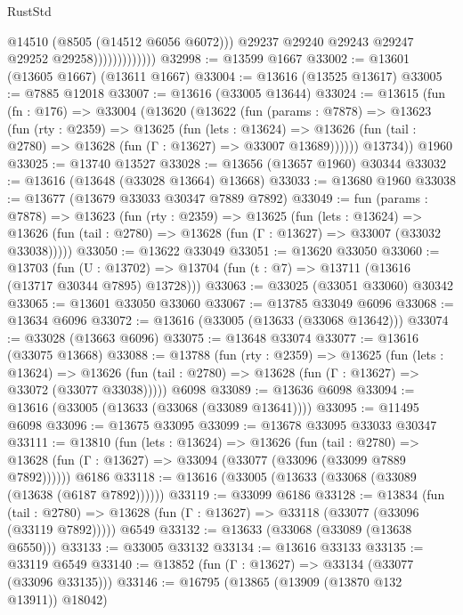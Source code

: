 \begin{lexlean}{RustStd}
\begin{coremodule}
                                @14510
                                (@8505 (@14512 @6056 @6072)))
                              @29237
                              @29240
                              @29243
                              @29247
                              @29252
                              @29258)))))))))))))
@32998 := @13599 @1667
@33002 := @13601 (@13605 @1667) (@13611 @1667)
@33004 := @13616 (@13525 @13617)
@33005 := @7885 @12018
@33007 := @13616 (@33005 @13644)
@33024 := @13615
    (fun (fn : @176) =>
    @33004
      (@13620
        (@13622
          (fun (params : @7878) =>
          @13623
            (fun (rty : @2359) =>
            @13625
              (fun (lets : @13624) =>
              @13626 (fun (tail : @2780) => @13628 (fun (Γ : @13627) => @33007 @13689))))))
        @13734))
    @1960
@33025 := @13740 @13527
@33028 := @13656 (@13657 @1960) @30344
@33032 := @13616 (@13648 (@33028 @13664) @13668)
@33033 := @13680 @1960
@33038 := @13677 (@13679 @33033 @30347 @7889 @7892)
@33049 := fun (params : @7878) =>
  @13623
    (fun (rty : @2359) =>
    @13625
      (fun (lets : @13624) =>
      @13626 (fun (tail : @2780) => @13628 (fun (Γ : @13627) => @33007 (@33032 @33038)))))
@33050 := @13622 @33049
@33051 := @13620 @33050
@33060 := @13703
    (fun (U : @13702) => @13704 (fun (t : @7) => @13711 (@13616 (@13717 @30344 @7895) @13728)))
@33063 := @33025 (@33051 @33060) @30342
@33065 := @13601 @33050 @33060
@33067 := @13785 @33049 @6096
@33068 := @13634 @6096
@33072 := @13616 (@33005 (@13633 (@33068 @13642)))
@33074 := @33028 (@13663 @6096)
@33075 := @13648 @33074
@33077 := @13616 (@33075 @13668)
@33088 := @13788
    (fun (rty : @2359) =>
    @13625
      (fun (lets : @13624) =>
      @13626 (fun (tail : @2780) => @13628 (fun (Γ : @13627) => @33072 (@33077 @33038)))))
    @6098
@33089 := @13636 @6098
@33094 := @13616 (@33005 (@13633 (@33068 (@33089 @13641))))
@33095 := @11495 @6098
@33096 := @13675 @33095
@33099 := @13678 @33095 @33033 @30347
@33111 := @13810
    (fun (lets : @13624) =>
    @13626
      (fun (tail : @2780) =>
      @13628 (fun (Γ : @13627) => @33094 (@33077 (@33096 (@33099 @7889 @7892))))))
    @6186
@33118 := @13616 (@33005 (@13633 (@33068 (@33089 (@13638 (@6187 @7892))))))
@33119 := @33099 @6186
@33128 := @13834
    (fun (tail : @2780) => @13628 (fun (Γ : @13627) => @33118 (@33077 (@33096 (@33119 @7892)))))
    @6549
@33132 := @13633 (@33068 (@33089 (@13638 @6550)))
@33133 := @33005 @33132
@33134 := @13616 @33133
@33135 := @33119 @6549
@33140 := @13852 (fun (Γ : @13627) => @33134 (@33077 (@33096 @33135)))
@33146 := @16795 (@13865 (@13909 (@13870 @132 @13911)) @18042)

\end{coremodule}
\end{lexlean}
